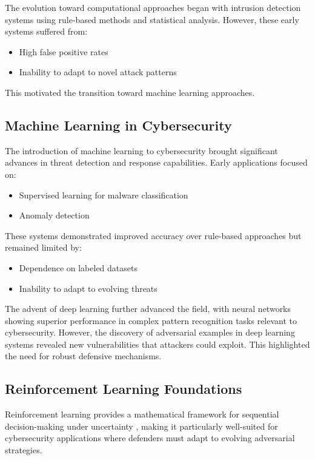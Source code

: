\documentclass[12pt]{article}
\theoremstyle{definition}
\theoremstyle{plain}
\begin{document}
The evolution toward computational approaches began with intrusion detection systems using rule-based methods and statistical analysis. However, these early systems suffered from:
\begin{itemize}
    \item High false positive rates
    \item Inability to adapt to novel attack patterns \citep{sommer2010outside}
\end{itemize}

This motivated the transition toward machine learning approaches.

\subsection{Machine Learning in Cybersecurity}

The introduction of machine learning to cybersecurity brought significant advances in threat detection and response capabilities. Early applications focused on:
\begin{itemize}
    \item Supervised learning for malware classification
    \item Anomaly detection \citep{sommer2010outside}
\end{itemize}

These systems demonstrated improved accuracy over rule-based approaches but remained limited by:
\begin{itemize}
    \item Dependence on labeled datasets
    \item Inability to adapt to evolving threats
\end{itemize}

The advent of deep learning further advanced the field, with neural networks showing superior performance in complex pattern recognition tasks relevant to cybersecurity. However, the discovery of adversarial examples in deep learning systems \citep{goodfellow2014explaining} revealed new vulnerabilities that attackers could exploit. This highlighted the need for robust defensive mechanisms.

\subsection{Reinforcement Learning Foundations}

Reinforcement learning provides a mathematical framework for sequential decision-making under uncertainty \citep{sutton2018reinforcement}, making it particularly well-suited for cybersecurity applications where defenders must adapt to evolving adversarial strategies.
\end{document}
